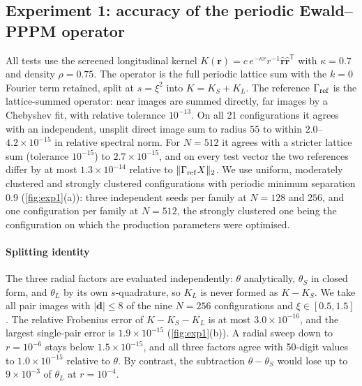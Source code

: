 \subsection{Experiment 1: accuracy of the periodic Ewald--PPPM operator}\label{sec:exp1}

All tests use the screened longitudinal kernel $K(\mathbf r)=c\,e^{-\kappa r}r^{-1}\hat{\mathbf r}\hat{\mathbf r}^{\mathsf T}$
with $\kappa=0.7$ and density $\rho=0.75$. The operator is the full periodic lattice sum with the $k=0$ Fourier term
retained, split at $s=\xi^2$ into $K=K_S+K_L$.
The reference $\Gamma_{\rm ref}$ is the lattice-summed operator: near images are summed directly, far images by a
Chebyshev fit, with relative tolerance $10^{-13}$. On all 21 configurations it agrees with an independent, unsplit
direct image sum to radius $55$ to within $2.0$--$4.2\times10^{-15}$ in relative spectral norm. For $N=512$ it agrees
with a stricter lattice sum (tolerance $10^{-15}$) to $2.7\times10^{-15}$, and on every test vector the two references
differ by at most $1.3\times10^{-14}$ relative to $\|\Gamma_{\rm ref}X\|_2$.
We use uniform, moderately clustered and strongly clustered configurations with periodic minimum separation $0.9$
(\cref{fig:exp1}(a)): three independent seeds per family at $N=128$ and $256$, and one configuration per family at
$N=512$, the strongly clustered one being the configuration on which the production parameters were optimised.

\paragraph{Splitting identity}
The three radial factors are evaluated independently: $\theta$ analytically, $\theta_S$ in closed form, and $\theta_L$
by its own $s$-quadrature, so $K_L$ is never formed as $K-K_S$.
We take all pair images with $|\mathbf d|\le8$ of the nine $N=256$ configurations and $\xi\in[0.5,1.5]$. The relative
Frobenius error of $K-K_S-K_L$ is at most $3.0\times10^{-16}$, and the largest single-pair error is
$1.9\times10^{-15}$ (\cref{fig:exp1}(b)).
A radial sweep down to $r=10^{-6}$ stays below $1.5\times10^{-15}$, and all three factors agree with 50-digit values to
$1.0\times10^{-15}$ relative to $\theta$. By contrast, the subtraction $\theta-\theta_S$ would lose up to
$9\times10^{-3}$ of $\theta_L$ at $r=10^{-4}$.


